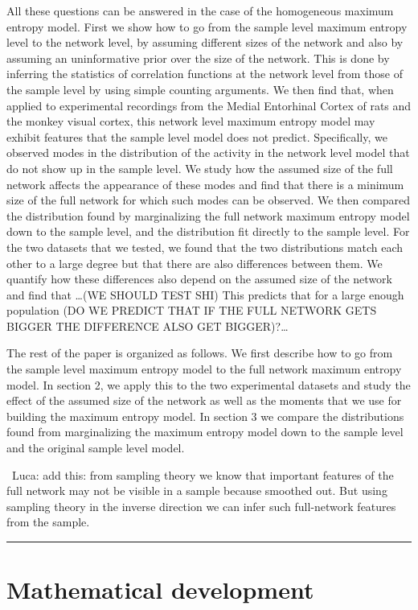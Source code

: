 \documentclass[\ifafour a4paper,12pt,\else a5paper,10pt,\fi%
onecolumn,oneside,article,%
british%
]{memoir}
\theoremstyle{remark}
\theoremstyle{innote}
\renewcommand*{\|}{\nonscript\,\vert\nonscript\;\mathopen{}}
\newcommand*{\puzzle}{{\fontencoding{U}\fontfamily{fontawesometwo}\selectfont\symbol{225}}}
\newcommand{\mynote}[1]{ {\color{notecolour}\puzzle\ #1}}
\begin{document}
All these questions can be answered in the case of the homogeneous maximum
entropy model. First we show how to go from the sample level maximum
entropy level to the network level, by assuming different sizes of the
network and also by assuming an uninformative prior over the size of the
network. This is done by inferring the statistics of correlation functions
at the network level from those of the sample level by using simple
counting arguments. We then find that, when applied to experimental
recordings from the Medial Entorhinal Cortex of rats and the monkey visual
cortex, this network level maximum entropy model may exhibit features that
the sample level model does not predict. Specifically, we observed modes in
the distribution of the activity in the network level model that do not
show up in the sample level. We study how the assumed size of the full
network affects the appearance of these modes and find that there is a
minimum size of the full network for which such modes can be observed. We
then compared the distribution found by marginalizing the full network
maximum entropy model down to the sample level, and the distribution fit
directly to the sample level. For the two datasets that we tested, we found
that the two distributions match each other to a large degree but that
there are also differences between them. We quantify how these differences
also depend on the assumed size of the network and find that …(WE SHOULD
TEST SHI) This predicts that for a large enough population (DO WE PREDICT
THAT IF THE FULL NETWORK GETS BIGGER THE DIFFERENCE ALSO GET BIGGER)?…

The rest of the paper is organized as follows. We first describe how to go
from the sample level maximum entropy model to the full network maximum
entropy model. In section 2, we apply this to the two experimental datasets
and study the effect of the assumed size of the network as well as the
moments that we use for building the maximum entropy model. In section 3 we
compare the distributions found from marginalizing the maximum entropy
model down to the sample level and the original sample level model.

\mynote{Luca: add this: from sampling theory we know that important
  features of the full network may not be visible in a sample because
  smoothed out. But using sampling theory in the inverse direction we can
  infer such full-network features from the sample.}


\hrule
\bigskip

\section{Mathematical development}
\label{sec:maths_development}
\end{document}
